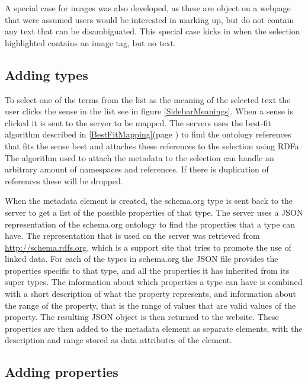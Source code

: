 A special case for images was also developed,
as these are object on a webpage that were assumed users would be interested in marking up,
but do not contain any text that can be disambiguated.
This special case kicks in when the selection highlighted contains an image tag, but no text.

\subsection{Adding types}

To select one of the terms from the list as the meaning of the selected text the user clicks the sense in the list see in
figure \ref{SidebarMeanings}.
When a sense is clicked it is sent to the server to be mapped.
The servers uses the best-fit algorithm described in \ref{BestFitMapping}(page \pageref{BestFitMapping}) to find the ontology references
that fits the sense best and attaches these references to the selection using RDFa.
The algorithm used to attach the metadata to the selection can handle an arbitrary amount of namespaces and references.
If there is duplication of references these will be dropped.

When the metadata element is created,
the schema.org type is sent back to the server to get a list of the possible properties of that type.
The server uses a JSON representation of the schema.org ontology to find the properties that a type can have.
The representation that is used on the server was retrieved from \url{http://schema.rdfs.org},
which is a support site that tries to promote the use of linked data.
For each of the types in schema.org the JSON file provides the properties specific to that type,
and all the properties it has inherited from its super types.
The information about which properties a type can have is combined with a short description of what the property represents,
and information about the range of the property, that is the range of values that are valid values of the property.
The resulting JSON object is then returned to the website.
These properties are then added to the metadata element as separate elements,
with the description and range stored as data attributes of the element.

\subsection{Adding properties}

